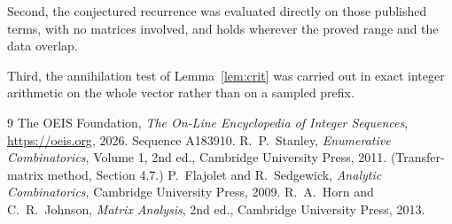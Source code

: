 \documentclass[11pt,a4paper]{article}
\theoremstyle{plain}
\theoremstyle{definition}
\begin{document}
Second, the conjectured recurrence was evaluated directly on those published terms, with no
matrices involved, and holds wherever the proved range and the data overlap.

Third, the annihilation test of Lemma~\ref{lem:crit} was carried out in exact integer
arithmetic on the whole vector rather than on a sampled prefix.

\begin{thebibliography}{9}
 The OEIS Foundation, \emph{The On-Line Encyclopedia of Integer
Sequences}, \url{https://oeis.org}, 2026. Sequence A183910.
 R.~P.~Stanley, \emph{Enumerative Combinatorics}, Volume 1, 2nd ed.,
Cambridge University Press, 2011. (Transfer-matrix method, Section 4.7.)
 P.~Flajolet and R.~Sedgewick, \emph{Analytic Combinatorics}, Cambridge
University Press, 2009.
 R.~A.~Horn and C.~R.~Johnson, \emph{Matrix Analysis}, 2nd ed., Cambridge
University Press, 2013.
\end{thebibliography}
\end{document}
